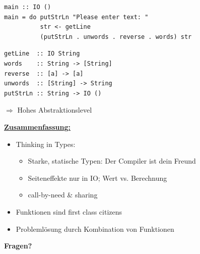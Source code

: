 \documentclass[unknownkeysallowed]{beamer}
\begin{document}
  \begin{frame}[fragile]

  \begin{verbatim}
main :: IO ()
main = do putStrLn "Please enter text: "
          str <- getLine
          (putStrLn . unwords . reverse . words) str
  \end{verbatim}
  
\pause

  \begin{verbatim}
getLine  :: IO String
words    :: String -> [String]
reverse  :: [a] -> [a]
unwords  :: [String] -> String
putStrLn :: String -> IO ()
  \end{verbatim}
\bigskip 
\pause

$\Rightarrow$ Hohes Abstraktionslevel

\end{frame}


\begin{frame}

\Large\textbf{\underline{Zusammenfassung:}}\bigskip\normalsize
\pause

\begin{itemize}
\item Thinking in Types: \pause
      \begin{itemize}
      \item Starke, statische Typen: Der Compiler ist dein Freund \pause
      \item Seiteneffekte nur in IO; Wert vs. Berechnung \pause
      \item call-by-need \& sharing
      \end{itemize}
\item Funktionen sind \glqq first class citizens\grqq \pause
\item Problemlösung durch Kombination von Funktionen  \pause
\end{itemize}
  
\end{frame}



\begin{frame}

\begin{center}
\Large\textbf{Fragen?}
\end{center}

\end{frame}
  
\end{document}
